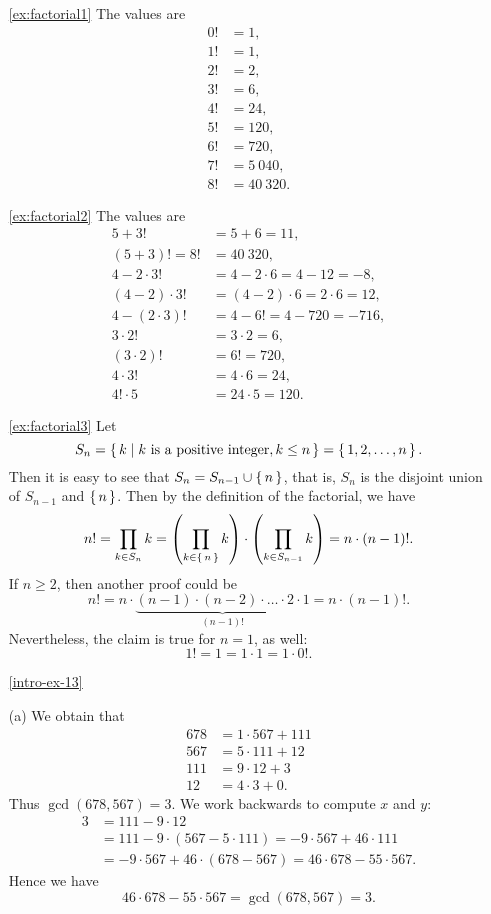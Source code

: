\begin{enumerate}
\item[\ref{ex:factorial1}]
The values are
\begin{align*}
0! &= 1, \\
1! &= 1, \\
2! &= 2, \\
3! &= 6, \\
4! &= 24, \\
5! &= 120, \\
6! &= 720, \\
7! &= 5~040, \\
8! &= 40~320.
\end{align*}

\item[\ref{ex:factorial2}]
The values are
\begin{align*}
5+3! &= 5+6 = 11, \\
(5+3)! = 8! &= 40~320, \\
4-2\cdot 3! &= 4-2\cdot 6 = 4-12=-8, \\
(4-2)\cdot 3! &= (4-2) \cdot 6 = 2 \cdot 6 = 12, \\
4 - (2 \cdot 3)! &= 4 - 6! = 4 - 720 = -716, \\
3 \cdot 2! &= 3 \cdot 2 = 6, \\
(3 \cdot 2)! &= 6! = 720, \\
4 \cdot 3! &= 4 \cdot 6 = 24, \\
4! \cdot 5 &= 24 \cdot 5 = 120. 
\end{align*}

\item[\ref{ex:factorial3}]
Let 
\[
S_n = \left\{\,k\mid k \text{ is a positive integer}, k\leq n\,\right\} = \left\{\,1, 2, \dots , n\,\right\}. 
\]
Then it is easy to see that $S_n = S_{n-1} \cup \left\{\,n\,\right\}$, 
that is, $S_n$ is the disjoint union of $S_{n-1}$ and $\left\{\,n\,\right\}$. 
Then by the definition of the factorial, 
we have 
\[
n! = \prod_{k \in S_n} k = \left( \prod_{k \in \left\{\,n\,\right\}} k \right) \cdot \left( \prod_{k \in S_{n-1}} k \right) = n \cdot (n-1)!. 
\]
If $n \geq 2$, then another proof could be 
\[
n! = n \cdot \underbrace{(n-1) \cdot (n-2) \cdot \dots \cdot 2 \cdot 1 }_{(n-1)!}= n \cdot (n-1)!. 
\]
Nevertheless, the claim is true for $n=1$, as well: 
\[
1! = 1 = 1 \cdot 1 = 1 \cdot 0!. 
\]


\item[\ref{intro-ex-13}]

(a) We obtain that
\begin{align*}
678 &= 1\cdot 567+111\\
567 &= 5\cdot 111+12\\
111 &= 9\cdot 12+3\\
12 &= 4\cdot 3+0.
\end{align*}
Thus $\gcd(678,567)=3$. We work backwards to compute $x$ and $y:$
\begin{align*}
3&=111-9\cdot 12\\
 &=111-9\cdot (567-5\cdot 111)=-9\cdot 567+46\cdot 111\\
 &=-9\cdot 567+46 \cdot (678-567)=46\cdot 678-55\cdot 567.
\end{align*}
Hence we have
$$
46\cdot 678-55\cdot 567=\gcd(678,567)=3.
$$


\end{enumerate}
